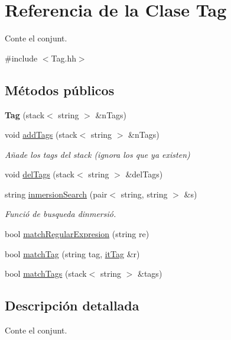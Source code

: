 \hypertarget{class_tag}{}\section{Referencia de la Clase Tag}
\label{class_tag}


Conte el conjunt.  




{\ttfamily \#include $<$Tag.\+hh$>$}

\subsection*{Métodos públicos}
\begin{DoxyCompactItemize}
\item 
\hypertarget{class_tag_acad3c793c59260259f92997df2778e07}{}{\bfseries Tag} (stack$<$ string $>$ \&n\+Tags)\label{class_tag_acad3c793c59260259f92997df2778e07}

\item 
void \hyperlink{class_tag_a427e68abe4fcda497e2b1b697bae9879}{add\+Tags} (stack$<$ string $>$ \&n\+Tags)
\begin{DoxyCompactList}\small\item\em Añade los tags del stack (ignora los que ya existen) \end{DoxyCompactList}\item 
void \hyperlink{class_tag_aa51960a077ff0607087ea34500929450}{del\+Tags} (stack$<$ string $>$ \&del\+Tags)
\item 
string \hyperlink{class_tag_a3fbf3cf3c1192806b1b23538f7b3fd4f}{inmersion\+Search} (pair$<$ string, string $>$ \&s)
\begin{DoxyCompactList}\small\item\em Funció de busqueda d\textquotesingle{}inmersió. \end{DoxyCompactList}\item 
bool \hyperlink{class_tag_afe9f536d194f4ae82a61f605cfd5b3b3}{match\+Regular\+Expresion} (string re)
\item 
bool \hyperlink{class_tag_ae2b54f8096632f04635140b36e808821}{match\+Tag} (string tag, \hyperlink{_tag_8cc_aa1ffaea98934d2496035b29e4bee1786}{it\+Tag} \&r)
\item 
bool \hyperlink{class_tag_abd2e470058c7f10cb56a4eb392311d20}{match\+Tags} (stack$<$ string $>$ \&tags)
\end{DoxyCompactItemize}


\subsection{Descripción detallada}
Conte el conjunt. 

